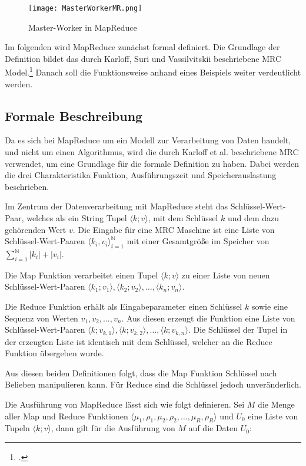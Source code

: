 \begin{figure}[h]
	\texttt{[image: MasterWorkerMR.png]}
	\caption{Master-Worker in MapReduce\footnotemark}
	\label{fig:MasterWorkerInMR}
\end{figure}

Im folgenden wird MapReduce zunächst formal definiert. Die Grundlage der Definition bildet das durch Karloff, Suri und Vassilvitskii beschriebene \ac{MRC} Model.\footcite[S. 3 f]{Karloff.2010} Danach soll die Funktionsweise anhand eines Beispiels weiter verdeutlicht werden.

\subsection{Formale Beschreibung}\label{subsec:FormaleBeschreibung}
Da es sich bei MapReduce um ein Modell zur Verarbeitung von Daten handelt, und nicht um einen Algorithmus, wird die durch Karloff et al. beschriebene \ac{MRC} verwendet, um eine Grundlage für die formale Definition zu haben. Dabei werden die drei Charakteristika Funktion, Ausführungszeit und Speicherauslastung beschrieben.

Im Zentrum der Datenverarbeitung mit MapReduce steht das Schlüssel-Wert-Paar, welches als ein String Tupel $\langle k; v \rangle$, mit dem Schlüssel $k$ und dem dazu gehörenden Wert $v$. Die Eingabe für eine \ac{MRC} Maschine ist eine Liste von Schlüssel-Wert-Paaren $\langle k_i, v_i \rangle_{i=1}^{\mathbb{N}}$ mit einer Gesamtgröße im Speicher von $\sum_{i=1}^{\mathbb{N}}|k_i|+|v_i|$.

Die Map Funktion verarbeitet einen Tupel $\langle k; v \rangle$ zu einer Liste von neuen Schlüssel-Wert-Paaren $\langle k_1; v_1 \rangle, \langle k_2; v_2 \rangle, \dots, \langle k_n; v_n \rangle$.

Die Reduce Funktion erhält als Eingabeparameter einen Schlüssel $k$ sowie eine Sequenz von Werten $v_1, v_2, \dots, v_n$. Aus diesen erzeugt die Funktion eine Liste von Schlüssel-Wert-Paaren $\langle k; v_{k,1} \rangle, \langle k; v_{k,2} \rangle, \dots, \langle k; v_{k,n} \rangle$. Die Schlüssel der Tupel in der erzeugten Liste ist identisch mit dem Schlüssel, welcher an die Reduce Funktion übergeben wurde.

Aus diesen beiden Definitionen folgt, dass die Map Funktion Schlüssel nach Belieben manipulieren kann. Für Reduce sind die Schlüssel jedoch unveränderlich.

Die Ausführung von MapReduce lässt sich wie folgt definieren. Sei $M$ die Menge aller Map und Reduce Funktionen $\langle \mu_1, \rho_1, \mu_2, \rho_2, \dots, \mu_R, \rho_R \rangle$ und $U_0$ eine Liste von Tupeln $\langle k; v \rangle$, dann gilt für die Ausführung von $M$ auf die Daten $U_0$:

